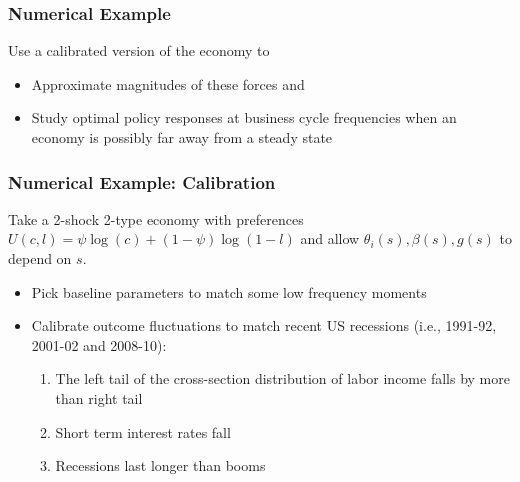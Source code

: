 \documentclass{beamer}
\begin{document}
\begin{frame}
 \frametitle{Numerical Example}

 Use a  calibrated version of the economy to
 \begin{itemize}
  \item Approximate magnitudes of these forces and
  \item Study optimal policy responses at business cycle frequencies when an economy is possibly far away from a steady state
 \end{itemize}
 \end{frame}
 \begin{frame}
 \frametitle{Numerical Example: Calibration}
Take a 2-shock 2-type economy with preferences $U(c,l)=\psi \log(c)+(1-\psi)\log(1-l)$ and allow $\theta_i(s),\beta(s),g(s)$ to depend on $s$.

 \begin{itemize}

 \item Pick  baseline parameters to match some low frequency moments

 \item Calibrate outcome fluctuations to match recent US recessions (i.e., 1991-92, 2001-02 and 2008-10):

 \begin{enumerate}
  \item The left tail of the cross-section distribution of labor income falls by more than right tail
  \item Short term interest rates fall
  \item Recessions last longer than booms
 \end{enumerate}

 \end{itemize}

\end{frame}
\end{document}
